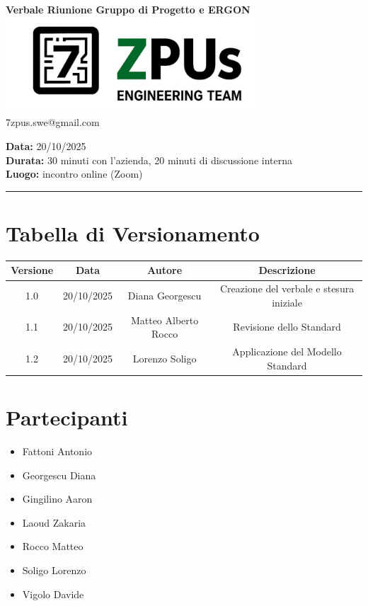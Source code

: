 \documentclass[a4paper,12pt]{article}
\begin{document}
\begin{center}
    \Large \textbf{Verbale Riunione Gruppo di Progetto e ERGON}\\
    \vspace{0.5cm}
    \includegraphics[width=9.5cm]{../../../images/logo7ZPUs2.jpg}
    \label{7zpus.swe@gmail.com}\\
    \small\hspace{10cm} 7zpus.swe@gmail.com
\end{center}


\noindent
\textbf{Data:} 20/10/2025 \\
\textbf{Durata:}  30 minuti con l'azienda, 20 minuti di discussione interna \\
\textbf{Luogo:} incontro online (Zoom)

\vspace{0.3cm}
\hrule
\vspace{0.5cm}

\tableofcontents

\newpage

\section{Tabella di Versionamento}
\begin{center}
\begin{tabular}{|c|c|c|c|}
    \hline
    \textbf{Versione} & \textbf{Data} & \textbf{Autore} & \textbf{Descrizione} \\
    \hline
    1.0 & 20/10/2025 & Diana Georgescu & Creazione del verbale e stesura iniziale \\
    \hline
    1.1 & 20/10/2025 & Matteo Alberto Rocco & Revisione dello Standard \\
    \hline
    1.2 & 20/10/2025 & Lorenzo Soligo & Applicazione del Modello Standard \\
    \hline
\end{tabular}
\end{center}

\section{Partecipanti}
{\small
\begin{itemize}[noitemsep, topsep=0pt, parsep=0pt, partopsep=0pt, leftmargin=1.8em]
    \item Fattoni Antonio
    \item Georgescu Diana
    \item Gingilino Aaron
    \item Laoud Zakaria
    \item Rocco Matteo
    \item Soligo Lorenzo
    \item Vigolo Davide
\end{itemize}
}
\end{document}
